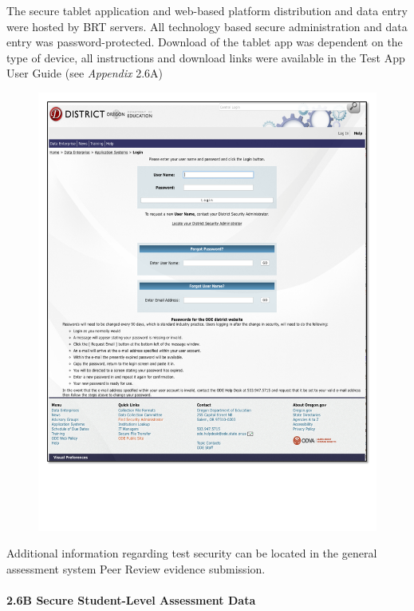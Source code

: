 \documentclass[]{article}
\let\oldparagraph\paragraph
\renewcommand{\paragraph}[1]{\oldparagraph{#1}\mbox{}}
\begin{document}
The secure tablet application and web-based platform distribution and
data entry were hosted by BRT servers. All technology based secure
administration and data entry was password-protected. Download of the
tablet app was dependent on the type of device, all instructions and
download links were available in the Test App User Guide (see
\emph{Appendix} 2.6A)

\begin{figure}
\centering
\includegraphics{Figures/TrainingSite/SecureSite.pdf}
\caption{}
\end{figure}

Additional information regarding test security can be located in the
general assessment system Peer Review evidence submission.

\paragraph{2.6B Secure Student-Level Assessment
Data}\label{b-secure-student-level-assessment-data}
\end{document}
